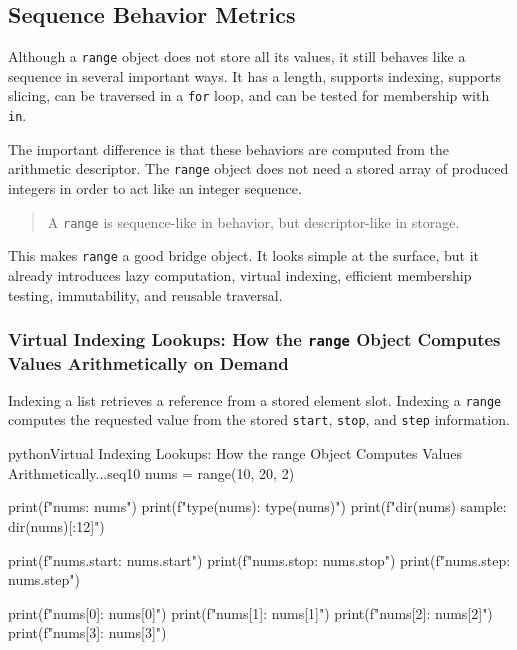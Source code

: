 \documentclass[a4paper,twoside]{report}
\begin{document}
\subsection{Sequence Behavior Metrics}

Although a \texttt{range} object does not store all its values, it still behaves like a sequence in several important ways. It has a length, supports indexing, supports slicing, can be traversed in a \texttt{for} loop, and can be tested for membership with \texttt{in}.

The important difference is that these behaviors are computed from the arithmetic descriptor. The \texttt{range} object does not need a stored array of produced integers in order to act like an integer sequence.

\begin{quote}
A \texttt{range} is sequence-like in behavior, but descriptor-like in storage.
\end{quote}

This makes \texttt{range} a good bridge object. It looks simple at the surface, but it already introduces lazy computation, virtual indexing, efficient membership testing, immutability, and reusable traversal.

\subsubsection{Virtual Indexing Lookups: How the \texttt{range} Object Computes Values Arithmetically on Demand}

Indexing a list retrieves a reference from a stored element slot. Indexing a \texttt{range} computes the requested value from the stored \texttt{start}, \texttt{stop}, and \texttt{step} information.

\begin{codebox}[]{python}{Virtual Indexing Lookups: How the range Object Computes Values Arithmetically...}{seq10}
nums = range(10, 20, 2)

print(f"nums: {nums}")
print(f"type(nums): {type(nums)}")
print(f"dir(nums) sample: {dir(nums)[:12]}")

print(f"nums.start: {nums.start}")
print(f"nums.stop: {nums.stop}")
print(f"nums.step: {nums.step}")

print(f"nums[0]: {nums[0]}")
print(f"nums[1]: {nums[1]}")
print(f"nums[2]: {nums[2]}")
print(f"nums[3]: {nums[3]}")
\end{codebox}
\end{document}

